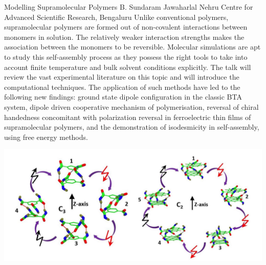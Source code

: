 
    \begin{abstract_online}{Modelling Supramolecular Polymers}{%
        B. Sundaram}{%
        \KLtag}{%
        Jawaharlal Nehru Centre for Advanced Scientific Research, Bengaluru}
    Unlike conventional polymers, supramolecular polymers are formed out of non-covalent interactions between monomers in solution. The relatively weaker interaction strengths makes the association between the monomers to be reversible. Molecular simulations are apt to study this self-assembly process as they possess the right tools to take into account finite temperature and bulk solvent conditions explicitly. The talk will review the vast experimental literature on this topic and will introduce the computational techniques. The application of such methods have led to the following new findings: ground state dipole configuration in the classic BTA system, dipole driven cooperative mechanism of polymerisation, reversal of chiral handedness concomitant with polarization reversal in ferroelectric thin films of supramolecular polymers, and the demonstration of isodesmicity in self-assembly, using free energy methods. \begin{center}  \includegraphics[width=\linewidth]{abstracts/txt/figures/bala.png}  \end{center}  
    
    \end{abstract_online}
    